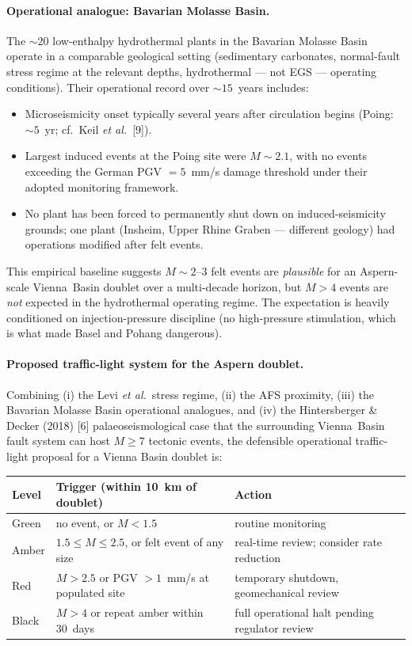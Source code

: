 \documentclass{article}
\begin{document}
\paragraph{Operational analogue: Bavarian Molasse Basin.} The
$\sim 20$ low-enthalpy hydrothermal plants in the Bavarian Molasse
Basin operate in a comparable geological setting (sedimentary
carbonates, normal-fault stress regime at the relevant depths,
hydrothermal --- not EGS --- operating conditions). Their
operational record over $\sim 15$~years includes:
\begin{itemize}
\item Microseismicity onset typically several years after
circulation begins (Poing: $\sim 5$~yr; cf.\ Keil \emph{et al.}\ [9]).
\item Largest induced events at the Poing site were
$M\sim 2.1$, with no events exceeding the German PGV $=5$~mm/s
damage threshold under their adopted monitoring framework.
\item No plant has been forced to permanently shut down on
induced-seismicity grounds; one plant (Insheim, Upper Rhine
Graben --- different geology) had operations modified after
felt events.
\end{itemize}
This empirical baseline suggests $M\sim 2$--$3$ felt events are
\emph{plausible} for an Aspern-scale Vienna~Basin doublet over a
multi-decade horizon, but $M > 4$ events are \emph{not} expected
in the hydrothermal operating regime. The expectation is heavily
conditioned on injection-pressure discipline (no high-pressure
stimulation, which is what made Basel and Pohang dangerous).

\paragraph{Proposed traffic-light system for the Aspern doublet.}
Combining (i) the Levi \emph{et al.}\ stress regime, (ii) the AFS
proximity, (iii) the Bavarian Molasse Basin operational analogues,
and (iv) the Hintersberger \& Decker (2018) [6]
palaeoseismological case that the surrounding Vienna~Basin fault
system can host $M \geq 7$ tectonic events, the defensible
operational traffic-light proposal for a Vienna Basin doublet is:

\begin{center}
\begin{tabular}{lll}
\hline
\textbf{Level} & \textbf{Trigger (within 10~km of doublet)} & \textbf{Action} \\
\hline
Green   & no event, or $M < 1.5$                  & routine monitoring \\
Amber   & $1.5 \leq M \leq 2.5$, or felt event of any size & real-time review; consider rate reduction \\
Red     & $M > 2.5$ or PGV $> 1$~mm/s at populated site & temporary shutdown, geomechanical review \\
Black   & $M > 4$ or repeat amber within 30~days  & full operational halt pending regulator review \\
\hline
\end{tabular}
\end{center}
\end{document}

